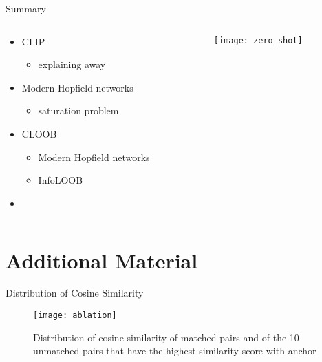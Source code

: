 \documentclass[utf8,aspectratio=169,ngerman,english,usenames,dvipsnames]{beamer}
\newcommand{\cmark}{\ding{51}}
\newcommand{\xmark}{\ding{55}}
\newcommand{\rarr}{\ding{212}}
\begin{document}
\begin{frame}{Summary}
    \begin{columns}
        \begin{column}{0.4\textwidth}
            \begin{itemize}
                \item[\rarr] CLIP \pause
                \begin{itemize}
                    \item[\xmark] explaining away \pause
                \end{itemize}
                \item[\rarr] Modern Hopfield networks \pause
                \begin{itemize}
                    \item[\xmark] saturation problem \pause
                \end{itemize}
                \item[\rarr] CLOOB \pause
                \begin{itemize}
                    \item[\cmark] Modern Hopfield networks \pause
                    \item[\cmark] InfoLOOB \pause
                \end{itemize}
                \item[\rarr] \smiley{} \pause
            \end{itemize}
        \end{column}
        \begin{column}{0.6\textwidth}
            \begin{figure}
                \centering
                \texttt{[image: zero\_shot]}
            \end{figure}
        \end{column}
    \end{columns}
\end{frame}

\section{Additional Material}

\begin{frame}{Distribution of Cosine Similarity}
    \vspace*{\fill} 
    \begin{figure}
        \centering
        \texttt{[image: ablation]}
        \caption*{Distribution of cosine similarity of matched pairs and of the 10 unmatched pairs that have the highest similarity score with anchor}
    \end{figure}
    \vspace*{\fill} 
\end{frame}
\end{document}
